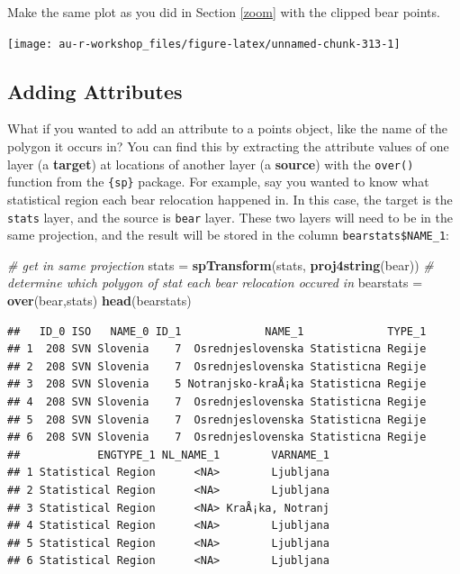 \documentclass[]{book}
\newenvironment{Shaded}{\begin{snugshade}}{\end{snugshade}}
\newcommand{\CommentTok}[1]{\textcolor[rgb]{0.56,0.35,0.01}{\textit{#1}}}
\newcommand{\KeywordTok}[1]{\textcolor[rgb]{0.13,0.29,0.53}{\textbf{#1}}}
\newcommand{\NormalTok}[1]{#1}
\newcommand{\StringTok}[1]{\textcolor[rgb]{0.31,0.60,0.02}{#1}}
\begin{document}
Make the same plot as you did in Section \ref{zoom} with the clipped bear points.

\begin{center}\texttt{[image: au-r-workshop\_files/figure-latex/unnamed-chunk-313-1]} \end{center}

\hypertarget{add-attr}{%
\subsection{Adding Attributes}\label{add-attr}}

What if you wanted to add an attribute to a points object, like the name of the polygon it occurs in? You can find this by extracting the attribute values of one layer (a \textbf{target}) at locations of another layer (a \textbf{source}) with the \texttt{over()} function from the \texttt{\{sp\}} package. For example, say you wanted to know what statistical region each bear relocation happened in. In this case, the target is the \texttt{stats} layer, and the source is \texttt{bear} layer. These two layers will need to be in the same projection, and the result will be stored in the column \texttt{bearstats\$NAME\_1}:

\begin{Shaded}
\begin{Highlighting}[]
\CommentTok{# get in same projection}
\NormalTok{stats =}\StringTok{ }\KeywordTok{spTransform}\NormalTok{(stats, }\KeywordTok{proj4string}\NormalTok{(bear))}
\CommentTok{# determine which polygon of stat each bear relocation occured in}
\NormalTok{bearstats =}\StringTok{ }\KeywordTok{over}\NormalTok{(bear,stats)}
\KeywordTok{head}\NormalTok{(bearstats)}
\end{Highlighting}
\end{Shaded}

\begin{verbatim}
##   ID_0 ISO   NAME_0 ID_1             NAME_1             TYPE_1
## 1  208 SVN Slovenia    7  Osrednjeslovenska Statisticna Regije
## 2  208 SVN Slovenia    7  Osrednjeslovenska Statisticna Regije
## 3  208 SVN Slovenia    5 Notranjsko-kraÅ¡ka Statisticna Regije
## 4  208 SVN Slovenia    7  Osrednjeslovenska Statisticna Regije
## 5  208 SVN Slovenia    7  Osrednjeslovenska Statisticna Regije
## 6  208 SVN Slovenia    7  Osrednjeslovenska Statisticna Regije
##            ENGTYPE_1 NL_NAME_1        VARNAME_1
## 1 Statistical Region      <NA>        Ljubljana
## 2 Statistical Region      <NA>        Ljubljana
## 3 Statistical Region      <NA> KraÅ¡ka, Notranj
## 4 Statistical Region      <NA>        Ljubljana
## 5 Statistical Region      <NA>        Ljubljana
## 6 Statistical Region      <NA>        Ljubljana
\end{verbatim}
\end{document}

